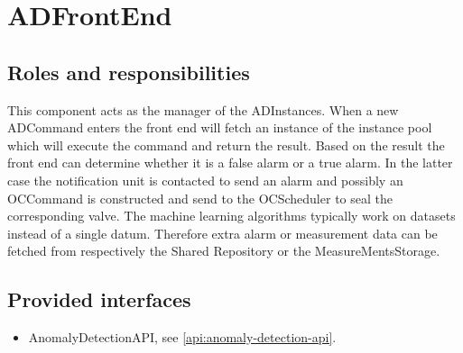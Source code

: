 \section{ADFrontEnd}
\label{element:ad-frontend}

\subsection{Roles and responsibilities}

\npar This component acts as the manager of the ADInstances. When a new
ADCommand enters the front end will fetch an instance of the instance pool which
will execute the command and return the result. Based on the result the front
end can determine whether it is a false alarm or a true alarm. In the latter
case the notification unit is contacted to send an alarm and possibly an
OCCommand is constructed and send to the OCScheduler to seal the corresponding
valve. The machine learning algorithms typically work on datasets instead of a
single datum. Therefore extra alarm or measurement data can be fetched from
respectively the Shared Repository or the MeasureMentsStorage.

\subsection{Provided interfaces}

\begin{itemize}
  \item AnomalyDetectionAPI, see \ref{api:anomaly-detection-api}.
\end{itemize}



